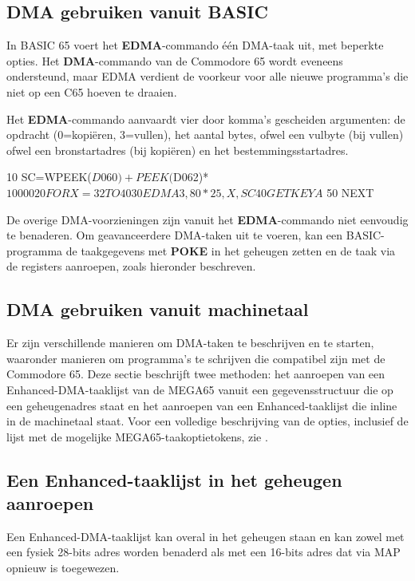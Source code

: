 \subsection{DMA gebruiken vanuit BASIC}

In BASIC 65 voert het {\bf EDMA}-commando één DMA-taak uit, met beperkte opties. Het {\bf DMA}-commando van de Commodore 65 wordt eveneens ondersteund, maar EDMA verdient de voorkeur voor alle nieuwe programma's die niet op een C65 hoeven te draaien.

Het \textbf{EDMA}-commando aanvaardt vier door komma's gescheiden argumenten: de opdracht (0=kopiëren, 3=vullen), het aantal bytes, ofwel een vulbyte (bij vullen) ofwel een bronstartadres (bij kopiëren) en het bestemmingsstartadres.

\begin{basiccode}
10 SC=WPEEK($D060)+PEEK($D062)*$10000
20 FOR X=32 TO 40
30 EDMA 3,80*25,X,SC
40 GETKEY A$
50 NEXT
\end{basiccode}

De overige DMA-voorzieningen zijn vanuit het \textbf{EDMA}-commando niet eenvoudig te benaderen. Om geavanceerdere DMA-taken uit te voeren, kan een BASIC-programma de taakgegevens met \textbf{POKE} in het geheugen zetten en de taak via de registers aanroepen, zoals hieronder beschreven.

\subsection{DMA gebruiken vanuit machinetaal}

Er zijn verschillende manieren om DMA-taken te beschrijven en te starten, waaronder manieren om programma's te schrijven die compatibel zijn met de Commodore 65. Deze sectie beschrijft twee methoden: het aanroepen van een Enhanced-DMA-taaklijst van de MEGA65 vanuit een gegevensstructuur die op een geheugenadres staat en het aanroepen van een Enhanced-taaklijst die inline in de machinetaal staat. Voor een volledige beschrijving van de opties, inclusief de lijst met de mogelijke MEGA65-taakoptietokens, zie .

\subsection{Een Enhanced-taaklijst in het geheugen aanroepen}

Een Enhanced-DMA-taaklijst kan overal in het geheugen staan en kan zowel met een fysiek 28-bits adres worden benaderd als met een 16-bits adres dat via MAP opnieuw is toegewezen.

